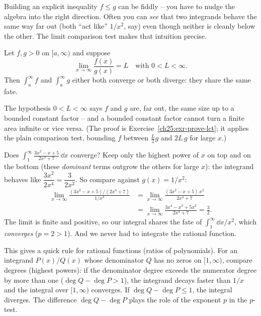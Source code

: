 Building an explicit inequality $f \le g$ can be fiddly -- you have to nudge the
algebra into the right direction. Often you can \emph{see} that two integrands
behave the same way far out (both ``act like'' $1/x^2$, say) even though neither is
cleanly below the other. The limit comparison test makes that intuition precise.

\begin{theorem}
\label{ch25:thm-limit-comparison}
Let $f, g > 0$ on $[a,\infty)$ and suppose
\[
  \lim_{x\to\infty}\frac{f(x)}{g(x)} = L
  \quad\text{with } 0 < L < \infty.
\]
Then $\int_a^\infty f$ and $\int_a^\infty g$ either both converge or both diverge:
they share the same fate.
\end{theorem}

The hypothesis $0 < L < \infty$ says $f$ and $g$ are, far out, the same size up to
a bounded constant factor -- and a bounded constant factor cannot turn a finite
area infinite or vice versa. (The proof is Exercise~\ref{ch25:exr-prove-lct}; it
applies the plain comparison test, bounding $f$ between $\frac{L}{2}g$ and
$2L\,g$ for large $x$.)

\begin{example}
\label{ch25:ex-limcomp}
Does $\displaystyle\int_1^{\infty}\frac{3x^2 - x + 5}{2x^4 + 7}\,\dd x$ converge?
Keep only the highest power of $x$ on top and on the bottom (these
\emph{dominant} terms outgrow the others for large $x$): the integrand behaves like
$\dfrac{3x^2}{2x^4} = \dfrac{3}{2x^2}$. So compare against $g(x) = 1/x^2$:
\begin{align*}
  \lim_{x\to\infty}\frac{(3x^2-x+5)/(2x^4+7)}{1/x^2}
  &= \lim_{x\to\infty}\frac{(3x^2-x+5)\,x^2}{2x^4+7}\\
  &= \lim_{x\to\infty}\frac{3x^4 - x^3 + 5x^2}{2x^4 + 7}
  = \frac{3}{2}.
\end{align*}
The limit is finite and positive, so our integral shares the fate of
$\int_1^\infty \dd x/x^2$, which \emph{converges} ($p=2 > 1$). And we never had to
integrate the rational function.
\end{example}

\begin{focusbox}
This gives a quick rule for rational functions (ratios of polynomials). For an
integrand $P(x)/Q(x)$ whose denominator $Q$ has no zeros on $[1,\infty)$, compare
degrees (highest powers): if the denominator degree exceeds the numerator degree by more than one
($\deg Q - \deg P > 1$), the integrand decays faster than $1/x$ and the integral over
$[1,\infty)$ converges. If $\deg Q - \deg P \le 1$, the integral diverges. The difference
$\deg Q - \deg P$ plays the role of the exponent $p$ in the $p$-test.
\end{focusbox}

